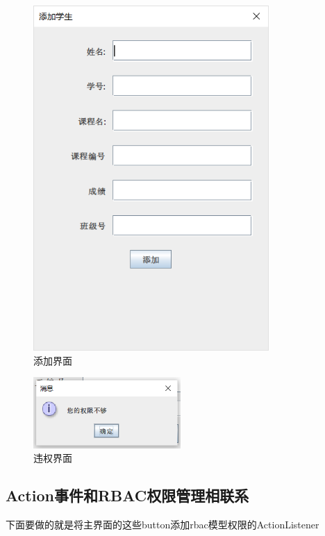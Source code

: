 \documentclass[12pt, a4paper, oneside]{ctexart}
\begin{document}
\begin{figure}[H]
    \centering
    \includegraphics[width = 0.8\textwidth]{../pic/3/3.4.png}
    \caption{添加界面}

\end{figure}\begin{figure}[H]
    \centering
    \includegraphics[width = 0.5\textwidth]{../pic/3/3.5.png}
    \caption{违权界面}
\end{figure}



\subsection{Action事件和RBAC权限管理相联系}
下面要做的就是将主界面的这些button添加rbac模型权限的ActionListener
\end{document}
